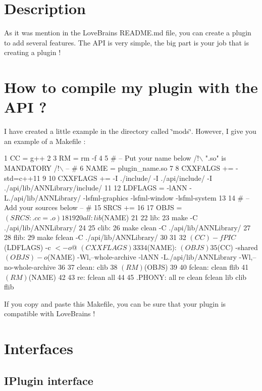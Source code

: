 \section*{Description}

As it was mention in the Love\+Brains R\+E\+A\+D\+M\+E.\+md file, you can create a plugin to add several features. The A\+P\+I is very simple, the big part is your job that is creating a plugin !

\section*{How to compile my plugin with the A\+P\+I ?}

I have created a little example in the directory called \char`\"{}mods\char`\"{}. However, I give you an example of a Makefile \+:


\begin{DoxyCode}
1 CC  = g++
2 
3 RM  = rm -f
4 
5 # -- Put your name below /!\(\backslash\) ".so" is MANDATORY /!\(\backslash\) -- #
6 NAME    = plugin\_name.so
7 
8 CXXFALGS    += -std=c++11
9 
10 CXXFLAGS    += -I ./include/ -I ./api/include/ -I ./api/lib/ANNLibrary/include/
11 
12 LDFLAGS = -lANN -L./api/lib/ANNLibrary/ -lsfml-graphics -lsfml-window -lsfml-system
13 
14 # -- Add your sources below -- #
15 SRCS    +=
16 
17 OBJS    = $(SRCS:.cc=.o)
18 
19 
20 all: lib $(NAME)
21 
22 lib:
23     make -C ./api/lib/ANNLibrary/
24 
25 clib:
26     make clean -C ./api/lib/ANNLibrary/
27 
28 flib:
29     make fclean -C ./api/lib/ANNLibrary/
30 
31 %
32     $(CC) -fPIC $(LDFLAGS) -c $< -o $@ $(CXXFLAGS)
33 
34 $(NAME): $(OBJS)
35     $(CC) -shared $(OBJS) -o $(NAME) -Wl,--whole-archive -lANN -L./api/lib/ANNLibrary
       -Wl,--no-whole-archive
36 
37 clean: clib
38     $(RM) $(OBJS)
39 
40 fclean: clean flib
41     $(RM) $(NAME)
42 
43 re: fclean all
44 
45 .PHONY: all re clean fclean lib clib flib
\end{DoxyCode}


If you copy and paste this Makefile, you can be sure that your plugin is compatible with Love\+Brains !

\section*{Interfaces}

\subsection*{I\+Plugin interface}



